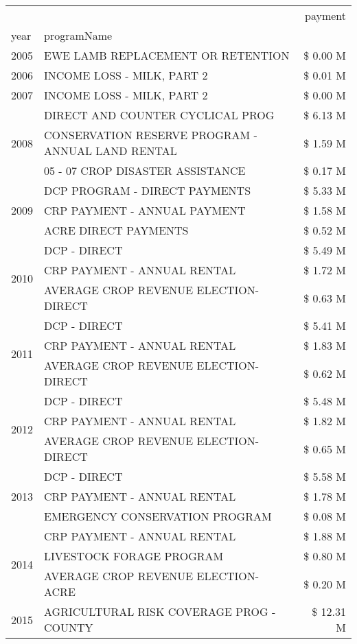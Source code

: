 \begin{tabular}{llr}
\toprule
 &  & payment \\
year & programName &  \\
\midrule
2005 & EWE LAMB REPLACEMENT OR RETENTION & \$ 0.00 M \\
\cline{1-3}
2006 & INCOME LOSS - MILK, PART 2 & \$ 0.01 M \\
\cline{1-3}
2007 & INCOME LOSS - MILK, PART 2 & \$ 0.00 M \\
\cline{1-3}
\multirow[t]{3}{*}{2008} & DIRECT AND COUNTER CYCLICAL PROG & \$ 6.13 M \\
 & CONSERVATION RESERVE PROGRAM - ANNUAL LAND RENTAL & \$ 1.59 M \\
 & 05 - 07 CROP DISASTER ASSISTANCE & \$ 0.17 M \\
\cline{1-3}
\multirow[t]{3}{*}{2009} & DCP PROGRAM - DIRECT PAYMENTS & \$ 5.33 M \\
 & CRP PAYMENT - ANNUAL PAYMENT & \$ 1.58 M \\
 & ACRE DIRECT PAYMENTS & \$ 0.52 M \\
\cline{1-3}
\multirow[t]{3}{*}{2010} & DCP - DIRECT & \$ 5.49 M \\
 & CRP PAYMENT - ANNUAL RENTAL & \$ 1.72 M \\
 & AVERAGE CROP REVENUE ELECTION-DIRECT & \$ 0.63 M \\
\cline{1-3}
\multirow[t]{3}{*}{2011} & DCP - DIRECT & \$ 5.41 M \\
 & CRP PAYMENT - ANNUAL RENTAL & \$ 1.83 M \\
 & AVERAGE CROP REVENUE ELECTION-DIRECT & \$ 0.62 M \\
\cline{1-3}
\multirow[t]{3}{*}{2012} & DCP - DIRECT & \$ 5.48 M \\
 & CRP PAYMENT - ANNUAL RENTAL & \$ 1.82 M \\
 & AVERAGE CROP REVENUE ELECTION-DIRECT & \$ 0.65 M \\
\cline{1-3}
\multirow[t]{3}{*}{2013} & DCP - DIRECT & \$ 5.58 M \\
 & CRP PAYMENT - ANNUAL RENTAL & \$ 1.78 M \\
 & EMERGENCY CONSERVATION PROGRAM & \$ 0.08 M \\
\cline{1-3}
\multirow[t]{3}{*}{2014} & CRP PAYMENT - ANNUAL RENTAL & \$ 1.88 M \\
 & LIVESTOCK FORAGE PROGRAM & \$ 0.80 M \\
 & AVERAGE CROP REVENUE ELECTION-ACRE & \$ 0.20 M \\
\cline{1-3}
\multirow[t]{3}{*}{2015} & AGRICULTURAL RISK COVERAGE PROG - COUNTY & \$ 12.31 M \\

\end{tabular}
